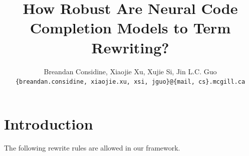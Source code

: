 \documentclass[usenames,dvipsnames]{article} %
\title{How Robust Are Neural Code Completion Models to Term Rewriting?}
\author{Breandan Considine, Xiaojie Xu, Xujie Si, Jin L.C. Guo\\
\texttt{\{breandan.considine, xiaojie.xu, xsi, jguo\}@\{mail, cs\}.mcgill.ca}\\
}
\begin{document}
  \maketitle

  \begin{abstract}
  \end{abstract}

  \section{Introduction}\label{sec:introduction}




  The following rewrite rules are allowed in our framework.
\end{document}
